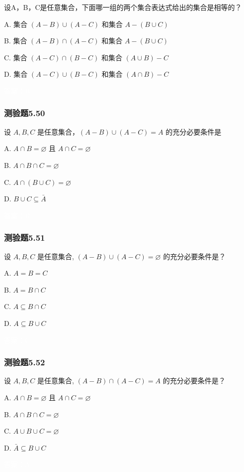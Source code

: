\documentclass[UTF8, heading=true]{ctexart}
\begin{document}
设A，B，C是任意集合，下面哪一组的两个集合表达式给出的集合是相等的？

A. 集合 $(A-B) \cup(A-C)$ 和集合 $A-(B \cup C)$

B. 集合 $(A-B) \cap(A-C)$ 和集合 $A-(B \cup C)$

C. 集合 $(A-C) \cap(B-C)$ 和集合 $(A \cup B)-C$

D.  集合 $(A-C) \cup(B-C)$ 和集合 $(A \cap B)-C$

\textcolor{white}{答案：B}

\subsubsection{测验题5.50}

设 $A, B, C$ 是任意集合，$(A-B) \cup(A-C)=A$ 的充分必要条件是

A. $A \cap B=\varnothing$ 且 $A \cap C=\varnothing$

B. $A \cap B \cap C=\varnothing$

C. $A \cap(B \cup C)=\varnothing$

D.  $B \cup C \subseteq \bar{A}$

\textcolor{white}{答案：B}

\subsubsection{测验题5.51}

设 $A, B, C$ 是任意集合, $(A-B) \cup(A-C)=\varnothing$ 的充分必要条件是？

A. $A=B=C$

B. $A=B \cap C$

C. $A \subseteq B \cap C$

D. $A \subseteq B \cup C$

\textcolor{white}{答案：C}

\subsubsection{测验题5.52}

设 $A, B, C$ 是任意集合, $(A-B) \cap(A-C)=A$ 的充分必要条件是？

A. $A \cap B=\varnothing$ 且 $A \cap C=\varnothing$

B. $A \cap B \cap C=\varnothing$

C. $A \cup B \cup C=\varnothing$

D. $\bar{A} \subseteq B \cup C$

\textcolor{white}{答案：A}
\end{document}

